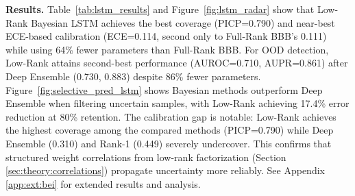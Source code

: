 \documentclass{article}
\theoremstyle{plain}
\theoremstyle{definition}
\theoremstyle{remark}
\begin{document}
\textbf{Results.} Table~\ref{tab:lstm_results} and Figure~\ref{fig:lstm_radar} show that Low-Rank Bayesian LSTM achieves the best coverage (PICP=0.790) and near-best ECE-based calibration (ECE=0.114, second only to Full-Rank BBB's 0.111) while using 64\% fewer parameters than Full-Rank BBB. For OOD detection, Low-Rank attains second-best performance (AUROC=0.710, AUPR=0.861) after Deep Ensemble (0.730, 0.883) despite 86\% fewer parameters. Figure~\ref{fig:selective_pred_lstm} shows Bayesian methods outperform Deep Ensemble when filtering uncertain samples, with Low-Rank achieving 17.4\% error reduction at 80\% retention. The calibration gap is notable: Low-Rank achieves the highest coverage among the compared methods (PICP=0.790) while Deep Ensemble (0.310) and Rank-1 (0.449) severely undercover. This confirms that structured weight correlations from low-rank factorization (Section \ref{sec:theory:correlations}) propagate uncertainty more reliably. 
See Appendix \ref{app:ext:bei} for extended results and analysis.
\begin{table}[!ht]
\centering
\caption{Beijing Air Quality results averaged over 4 independent runs. Results are reported as mean $\pm$ standard deviation. Best in \textbf{bold}, second \underline{underlined}. Arrows indicate optimization direction: $\uparrow$ (higher better), $\downarrow$ (lower better).}
\label{tab:lstm_results}
\end{table}
\end{document}
